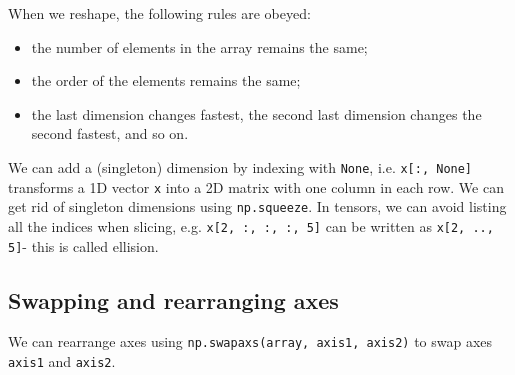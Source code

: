 \documentclass[a4paper, openany]{memoir}
\begin{document}
    When we reshape, the following rules are obeyed:
    \begin{itemize}
        \item the number of elements in the array remains the same;
        \item the order of the elements remains the same;
        \item the last dimension changes fastest, the second last dimension changes the second fastest, and so on.
    \end{itemize}
    We can add a (singleton) dimension by indexing with \texttt{None}, i.e. \texttt{x[:, None]} transforms a 1D vector \texttt{x} into a 2D matrix with one column in each row. We can get rid of singleton dimensions using \texttt{np.squeeze}. In tensors, we can avoid listing all the indices when slicing, e.g. \texttt{x[2, :, :, :, 5]} can be written as \texttt{x[2, .., 5]}- this is called ellision.

    \subsection{Swapping and rearranging axes}
    We can rearrange axes using \texttt{np.swapaxs(array, axis1, axis2)} to swap axes \texttt{axis1} and \texttt{axis2}.        
    
\end{document}

